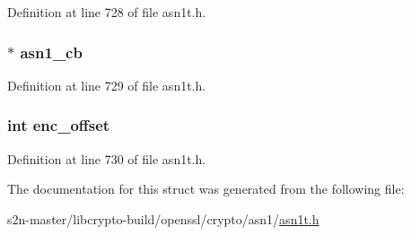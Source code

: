 Definition at line 728 of file asn1t.\+h.

\subsubsection[{\texorpdfstring{asn1\+\_\+cb}{asn1_cb}}]{ $\ast$ asn1\+\_\+cb}\hypertarget{struct_a_s_n1___a_u_x__st_a7949f7f8d6a797441e31fe5a15675b0e}{}\label{struct_a_s_n1___a_u_x__st_a7949f7f8d6a797441e31fe5a15675b0e}


Definition at line 729 of file asn1t.\+h.

\subsubsection[{\texorpdfstring{enc\+\_\+offset}{enc_offset}}]{\setlength{\rightskip}{0pt plus 5cm}int enc\+\_\+offset}\hypertarget{struct_a_s_n1___a_u_x__st_a253f42df0c986d3f6e4f7a4532c23b86}{}\label{struct_a_s_n1___a_u_x__st_a253f42df0c986d3f6e4f7a4532c23b86}


Definition at line 730 of file asn1t.\+h.



The documentation for this struct was generated from the following file\+:\begin{DoxyCompactItemize}
\item 
s2n-\/master/libcrypto-\/build/openssl/crypto/asn1/\hyperlink{crypto_2asn1_2asn1t_8h}{asn1t.\+h}\end{DoxyCompactItemize}
